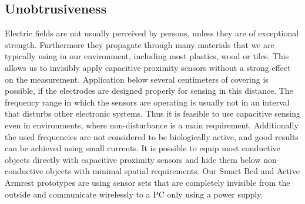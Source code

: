\subsection{Unobtrusiveness}
Electric fields are not usually perceived by persons, unless they are of exceptional strength. Furthermore they propagate through many materials that we are typically using in our environment, including most plastics, wood or tiles. This allows us to invisibly apply capacitive proximity sensors without a strong effect on the measurement. Application below several centimeters of covering is possible, if the electrodes are designed properly for sensing in this distance.
The frequency range in which the sensors are operating is usually not in an interval that disturbs other electronic systems. Thus it is feasible to use capacitive sensing even in environments, where non-disturbance is a main requirement.  Additionally the used frequencies are not considered to be biologically active, and good results can be achieved using small currents. 
It is possible to equip most conductive objects directly with capacitive proximity sensors and hide them below non-conductive objects with minimal spatial requirements. Our Smart Bed and Active Armrest prototypes are using sensor sets that are completely invisible from the outside and communicate wirelessly to a PC only using a power supply. 
